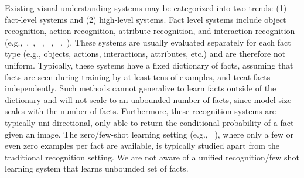 \documentclass[runningheads]{llncs}
\begin{document}
Existing visual understanding systems may be categorized into two trends: (1)  fact-level systems and (2) high-level systems. Fact level  systems include object recognition, action recognition, attribute recognition, and interaction recognition  (e.g.,~\cite{simonyan2014very},~\cite{zhang2014panda}, ~\cite{chen2014inferring}, ~\cite{zhou2014learning}, ~\cite{gkioxari2014finding},~\cite{Antol2014}). These systems are usually evaluated 
separately for each fact type (e.g., objects, actions, interactions, attributes, etc.) and are therefore not uniform. 
Typically, these systems have a fixed dictionary of facts, assuming that facts are seen during training by at least tens of examples, and treat facts independently. Such methods cannot generalize to learn facts outside of the dictionary and will not scale to an unbounded number of facts, since model size scales with the number of facts. 
Furthermore, these recognition systems are typically uni-directional, only able to return the conditional probability of a fact given an image. 
The zero/few-shot learning setting (e.g., ~\cite{romera2015embarrassingly,lampert2009learning}),  where only a few or even zero examples per fact are available, is typically studied apart from the traditional recognition setting. 
We are not aware of a unified recognition/few shot learning system that learns unbounded set of facts.    
\end{document}
